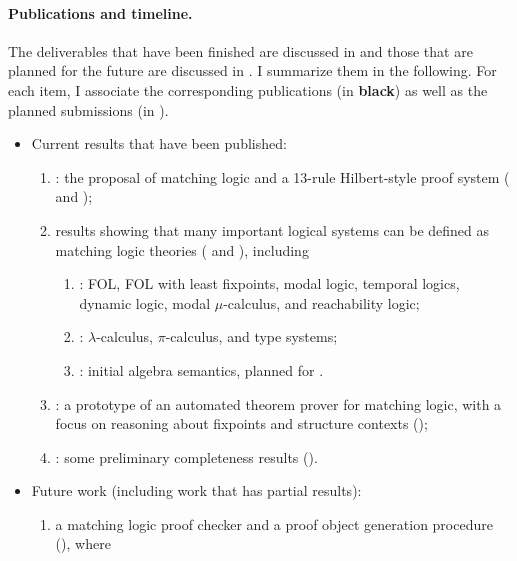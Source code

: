 \documentclass[11pt]{article}
\begin{document}
\paragraph{Publications and timeline.}

The deliverables that have been finished are discussed in 
and those that are planned for the future are discussed in 
. 
I summarize them in the following.
For each item, I associate the corresponding publications (in \textbf{black}) 
as well as the planned submissions (in \textbf{}).

\begin{itemize}
\item Current results that have been published:
\begin{enumerate}
\item \textbf{\cite[LICS2019]{CR19}}: the proposal of matching logic and a 13-rule Hilbert-style proof system 
( and );
\item results showing that many important logical systems can be defined as matching logic theories ( and ), including
\begin{enumerate}
\item \textbf{\cite[LICS2019]{CR19}}: FOL, FOL with least fixpoints, modal logic, temporal logics, dynamic logic, modal $\mu$-calculus, and reachability logic;
\item \textbf{\cite[ICFP2020]{CR20}}: $\lambda$-calculus, $\pi$-calculus, and type systems;
\item \textbf{\cite[TechRep2020]{CLR20}}: initial algebra semantics, planned for \textbf{\plan{[LICS2021]}}. 
\end{enumerate}
\item \textbf{\cite[OOPSLA2020]{CTR20}}: 
a prototype of an automated theorem prover for matching logic, with a 
focus on reasoning about fixpoints and structure contexts ();
\item \textbf{\cite[LICS2019]{CR19}}: some preliminary completeness results ().
\end{enumerate}
\item Future work (including work that has partial results):
\begin{enumerate}
\item a matching logic proof checker and a proof object generation procedure
(), where
\begin{enumerate}

\end{enumerate}
\end{enumerate}
\end{itemize}
\end{document}

